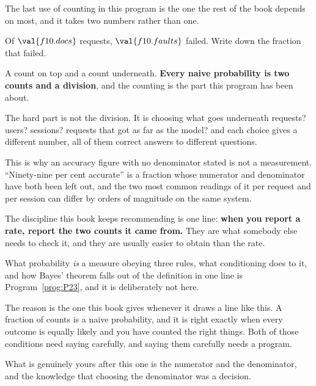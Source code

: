 \begin{fr}
The last use of counting in this program is the one the rest of the book
depends on most, and it takes two numbers rather than one.

Of $\val{f10.docs}$ requests, $\val{f10.faults}$ failed. Write down the
fraction that failed.
\nextframe
\end{fr}

\begin{fr}
A count on top and a count underneath. \textbf{Every naive probability is two
counts and a division}, and the counting is the part this program has been
about.

The hard part is not the division. It is choosing what goes underneath \dash{}
requests? users? sessions? requests that got as far as the model? \dash{} and
each choice gives a different number, all of them correct answers to different
questions.

\begin{aibox}
This is why an accuracy figure with no denominator stated is not a
measurement. \enquote{Ninety-nine per cent accurate} is a fraction whose
numerator and denominator have both been left out, and the two most common
readings of it \dash{} per request and per session \dash{} can differ by
orders of magnitude on the same system.

The discipline this book keeps recommending is one line: \textbf{when you
report a rate, report the two counts it came from.} They are what somebody
else needs to check it, and they are usually easier to obtain than the rate.
\end{aibox}
\end{fr}

\begin{fr}
What probability \emph{is} \dash{} a measure obeying three rules, what
conditioning does to it, and how Bayes' theorem falls out of the definition in
one line \dash{} is Program~\ref{prog:P23}, and it is deliberately not here.

The reason is the one this book gives whenever it draws a line like this. A
fraction of counts is a naive probability, and it is right exactly when every
outcome is equally likely and you have counted the right things. Both of those
conditions need saying carefully, and saying them carefully needs a program.

What is genuinely yours after this one is the numerator and the denominator,
and the knowledge that choosing the denominator was a decision.
\end{fr}

